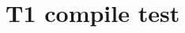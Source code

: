 \documentclass{article}
\begin{document}
\section*{T1 compile test}
\begin{landscape}

\end{landscape}
\clearpage

\end{document}
